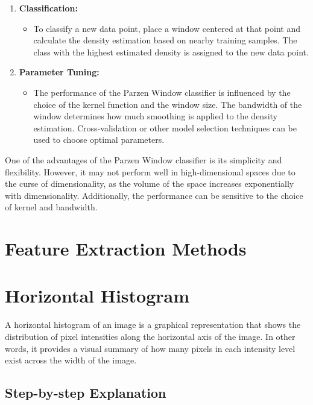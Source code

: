 \documentclass[9pt,twocolumn]{paper-template}
\begin{document}
\begin{enumerate}[label={\arabic*.}, font=\bfseries]
	\item \textbf{Classification:}
	\begin{itemize}
		\item To classify a new data point, place a window centered at that point and calculate the density estimation based on nearby training samples. The class with the highest estimated density is assigned to the new data point.
	\end{itemize}
	
	\item \textbf{Parameter Tuning:}
	\begin{itemize}
		\item The performance of the Parzen Window classifier is influenced by the choice of the kernel function and the window size. The bandwidth of the window determines how much smoothing is applied to the density estimation. Cross-validation or other model selection techniques can be used to choose optimal parameters.
	\end{itemize}
	
\end{enumerate}

One of the advantages of the Parzen Window classifier is its simplicity and flexibility. However, it may not perform well in high-dimensional spaces due to the curse of dimensionality, as the volume of the space increases exponentially with dimensionality. Additionally, the performance can be sensitive to the choice of kernel and bandwidth.




\section*{Feature Extraction Methods}





\section*{Horizontal Histogram }

A horizontal histogram of an image is a graphical representation that shows the distribution of pixel intensities along the horizontal axis of the image. In other words, it provides a visual summary of how many pixels in each intensity level exist across the width of the image.

\subsection*{Step-by-step Explanation}
\end{document}
